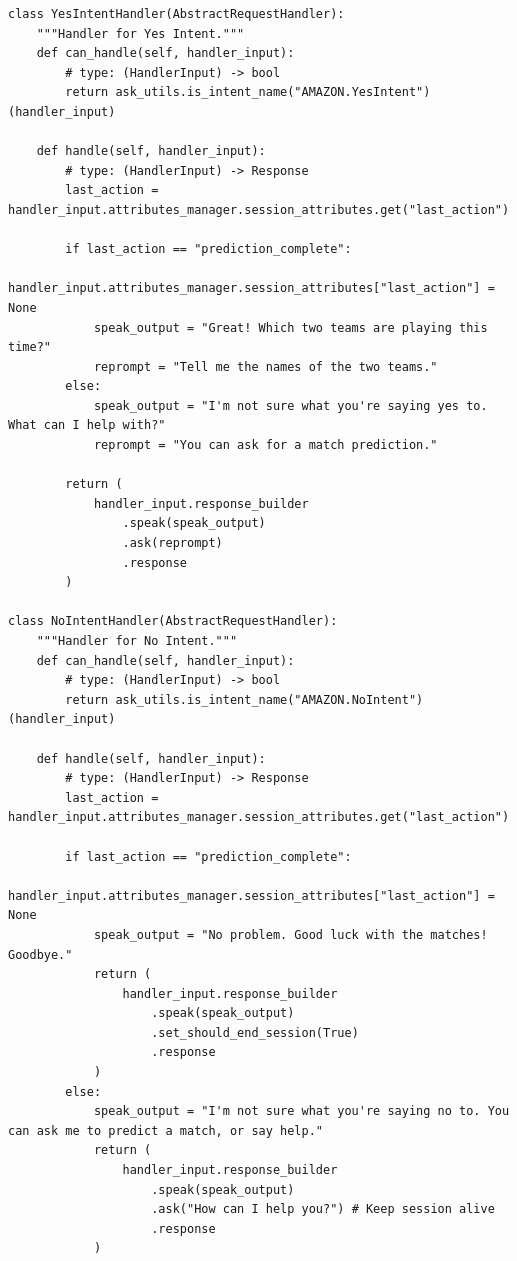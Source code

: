 \begin{lstlisting}[style=code, caption={Implementation of the Yes and No intent handlers using session attributes for contextual routing.}]
class YesIntentHandler(AbstractRequestHandler):
    """Handler for Yes Intent."""
    def can_handle(self, handler_input):
        # type: (HandlerInput) -> bool
        return ask_utils.is_intent_name("AMAZON.YesIntent")(handler_input)

    def handle(self, handler_input):
        # type: (HandlerInput) -> Response
        last_action = handler_input.attributes_manager.session_attributes.get("last_action")

        if last_action == "prediction_complete":
            handler_input.attributes_manager.session_attributes["last_action"] = None
            speak_output = "Great! Which two teams are playing this time?"
            reprompt = "Tell me the names of the two teams."
        else:
            speak_output = "I'm not sure what you're saying yes to. What can I help with?"
            reprompt = "You can ask for a match prediction."
        
        return (
            handler_input.response_builder
                .speak(speak_output)
                .ask(reprompt)
                .response
        )
    
class NoIntentHandler(AbstractRequestHandler):
    """Handler for No Intent."""
    def can_handle(self, handler_input):
        # type: (HandlerInput) -> bool
        return ask_utils.is_intent_name("AMAZON.NoIntent")(handler_input)

    def handle(self, handler_input):
        # type: (HandlerInput) -> Response
        last_action = handler_input.attributes_manager.session_attributes.get("last_action")

        if last_action == "prediction_complete":
            handler_input.attributes_manager.session_attributes["last_action"] = None
            speak_output = "No problem. Good luck with the matches! Goodbye."
            return (
                handler_input.response_builder
                    .speak(speak_output)
                    .set_should_end_session(True)
                    .response
            )
        else:
            speak_output = "I'm not sure what you're saying no to. You can ask me to predict a match, or say help."
            return (
                handler_input.response_builder
                    .speak(speak_output)
                    .ask("How can I help you?") # Keep session alive
                    .response
            )
\end{lstlisting}

